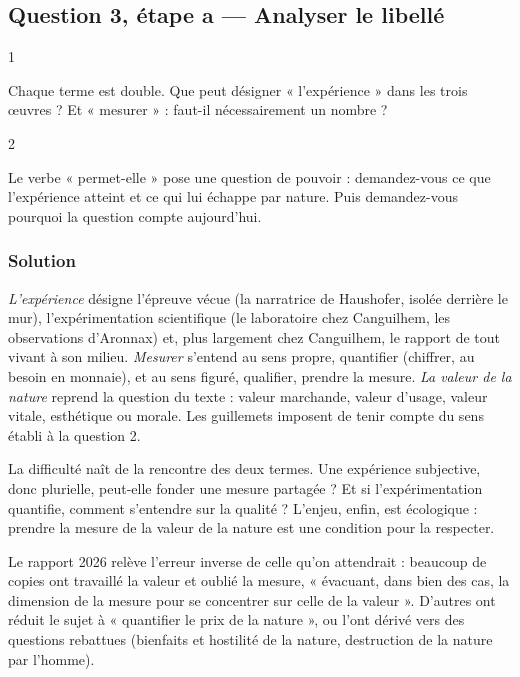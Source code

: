 \documentclass[11pt,a4paper]{article}
\begin{document}
\hypertarget{question-3-uxe9tape-a-analyser-le-libelluxe9}{%
\subsection{Question 3, étape a --- Analyser le libellé}\label{question-3-uxe9tape-a-analyser-le-libelluxe9}}

\begin{indication}{1}

Chaque terme est double. Que peut désigner « l'expérience » dans les trois œuvres ? Et « mesurer » : faut-il nécessairement un nombre ?

\end{indication}

\begin{indication}{2}

Le verbe « permet-elle » pose une question de pouvoir : demandez-vous ce que l'expérience atteint et ce qui lui échappe par nature. Puis demandez-vous pourquoi la question compte aujourd'hui.

\end{indication}

\hypertarget{solution-3}{%
\subsubsection{Solution}\label{solution-3}}

\emph{L'expérience} désigne l'épreuve vécue (la narratrice de Haushofer, isolée derrière le mur), l'expérimentation scientifique (le laboratoire chez Canguilhem, les observations d'Aronnax) et, plus largement chez Canguilhem, le rapport de tout vivant à son milieu. \emph{Mesurer} s'entend au sens propre, quantifier (chiffrer, au besoin en monnaie), et au sens figuré, qualifier, prendre la mesure. \emph{La valeur de la nature} reprend la question du texte : valeur marchande, valeur d'usage, valeur vitale, esthétique ou morale. Les guillemets imposent de tenir compte du sens établi à la question 2.

La difficulté naît de la rencontre des deux termes. Une expérience subjective, donc plurielle, peut-elle fonder une mesure partagée ? Et si l'expérimentation quantifie, comment s'entendre sur la qualité ? L'enjeu, enfin, est écologique : prendre la mesure de la valeur de la nature est une condition pour la respecter.

\begin{piege}

Le rapport 2026 relève l'erreur inverse de celle qu'on attendrait : beaucoup de copies ont travaillé la valeur et oublié la mesure, « évacuant, dans bien des cas, la dimension de la mesure pour se concentrer sur celle de la valeur ». D'autres ont réduit le sujet à « quantifier le prix de la nature », ou l'ont dérivé vers des questions rebattues (bienfaits et hostilité de la nature, destruction de la nature par l'homme).

\end{piege}
\end{document}
